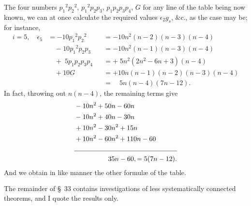 \documentclass[11pt,a4paper,english]{article}
\theoremstyle{plain}
\begin{document}
The four numbers ${p_1}^2{p_2}^2$, ${p_1}^2p_2p_3$, $p_1p_2p_3p_4$, $G$ for any line of the table being now known, we can at once calculate the required values $\epsilon_2 g_s$, \&c., as the case may be; for instance,
\begin{align*}
i = 5, \quad \epsilon_5 &= -10{p_1}^2{p_2}^2 &&= -10n^2(n-2)(n-3)(n-4) \\
&\quad - 10{p_1}^2p_2p_3 &&= -10n^2(n-1)(n-3)(n-4) \\
&\quad + \; 5p_1p_2p_3p_4 &&= + \; 5n^2(2n^2 - 6n + 3)(n-4) \\
&\quad + 10G &&= +10n(n-1)(n-2)(n-3)(n-4) \\
&\quad\quad\quad\quad\quad &&= \quad 5n(n-4)(7n - 12).
\end{align*}
In fact, throwing out $n(n-4)$, the remaining terms give
\begin{align*}
&-10n^2 + 50n - 60n \\
&-10n^2 + 40n - 30n \\
&+10n^2 - 30n^2 + 15n \\
&+10n^2 - 60n^2 + 110n - 60 \\
\cline{1-2}
&\quad\quad\quad\quad\quad 35n - 60, = 5(7n - 12).
\end{align*}
And we obtain in like manner the other formul\ae{} of the table.

The remainder of \S\ 33 contains investigations of less systematically connected theorems, and I quote the results only.
\end{document}
